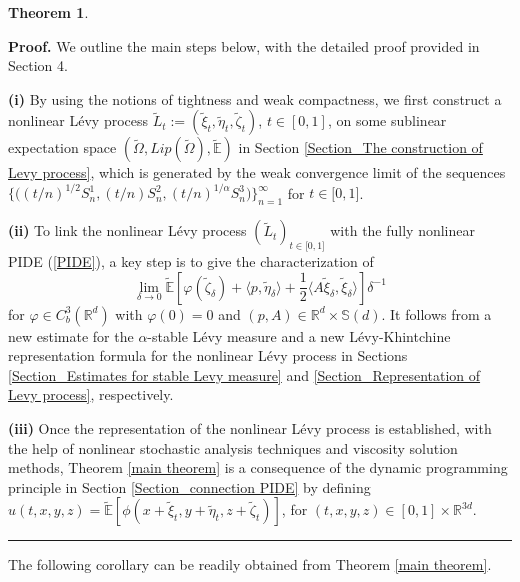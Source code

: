 \documentclass[a4paper,oneside,10pt]{article}%
\newtheorem{theorem}{Theorem}[section]
\newenvironment{proof}[1][Proof]{\noindent \textbf{#1.} }{\  \rule{0.5em}{0.5em}}
\numberwithin{equation}{section}
\begin{document}
\begin{theorem}
\end{theorem}

\begin{proof}
We outline the main steps below, with the detailed proof provided in Section 4.

\textbf{(i)} By using the notions of tightness and weak compactness, we first
construct a nonlinear L\'evy process $\tilde{L}_{t}:=(\tilde{ \xi}_{t},
\tilde{\eta}_{t},\tilde{\zeta}_{t})$, $t\in[0,1]$, on some sublinear
expectation space $(\tilde{\Omega},Lip(\tilde{\Omega}),\mathbb{\tilde{E}})$ in
Section \ref{Section_The construction of Levy process}, which is generated by
the weak convergence limit of the sequences $\big \{ \big(
(t/n)^{1/2}S_{n}^{1},(t/n)S_{n}^{2},(t/n)^{1/\alpha}S_{n}^{3}\big)\big \}
_{n=1}^{\infty}$ for $t\in \lbrack0,1]$.

\textbf{(ii)} To link the nonlinear L\'evy process $(\tilde{L}_{t}
)_{t\in \lbrack0,1]}$ with the fully nonlinear PIDE (\ref{PIDE}), a key step is
to give the characterization of
\[
\lim \limits_{\delta \rightarrow0}\mathbb{\tilde{E}}[\varphi(\tilde{\zeta}
_{\delta})+\langle p,\tilde{\eta}_{\delta}\rangle+\frac{1}{2}\langle A
\tilde{\xi}_{\delta},\tilde{\xi}_{\delta}\rangle]\delta^{-1}%
\]
for $\varphi \in C_{b}^{3}(\mathbb{R}^{d})$ with $\varphi(0)=0$ and
$(p,A)\in \mathbb{R}^{d}\times \mathbb{S}(d)$. It follows from a new estimate
for the $\alpha$-stable L\'{e}vy measure and a new L\'evy-Khintchine
representation formula for the nonlinear L\'{e}vy process in Sections
\ref{Section_Estimates for stable Levy measure} and
\ref{Section_Representation of Levy process}, respectively.

\textbf{(iii)} Once the representation of the nonlinear L\'evy process is
established, with the help of nonlinear stochastic analysis techniques and
viscosity solution methods, Theorem \ref{main theorem} is a consequence of the
dynamic programming principle in Section \ref{Section_connection PIDE} by
defining $u(t,x,y,z)=\mathbb{\tilde{E}}[\phi(x+\tilde{\xi} _{t},y+\tilde{
\eta}_{t},z+\tilde{\zeta}_{t})]$, for $(t,x,y,z)\in[0,1]\times \mathbb{R}^{3d}$.
\end{proof}

The following corollary can be readily obtained from Theorem
\ref{main theorem}.
\end{document}
